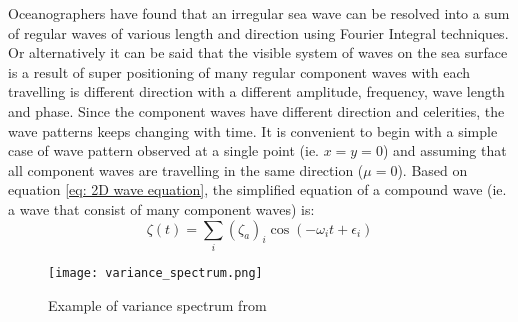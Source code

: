 Oceanographers have found that an irregular sea wave can be resolved into a sum
of regular waves of various length and direction using Fourier Integral
techniques. Or alternatively it can be said that the visible system of waves on
the sea surface is a result of super positioning of many regular component waves
with each travelling is different direction with a different amplitude,
frequency, wave length and phase. Since the component waves have different
direction and celerities, the wave patterns keeps changing with time.  It is
convenient to begin with a simple case of wave pattern observed at a single
point (ie. $x = y = 0$) and assuming that all component waves are travelling in
the same direction ($\mu = 0$). Based on equation 
\ref{eq: 2D wave equation}, the simplified equation of a compound wave (ie. a 
wave that consist of many component waves) is:
\begin{equation}
  \zeta(t) = \sum _{i} (\zeta_a)_i \cos(-\omega_i t + \epsilon_i)
  \label{eq: 2D irregular wave equation}
\end{equation}

\begin{figure}
  \centering
  \texttt{[image: variance\_spectrum.png]}
  \caption{Example of variance spectrum from \cite{lewis1988principles}}
  \label{fig: variance spectrum}
\end{figure}

